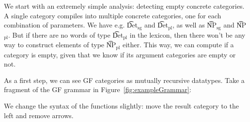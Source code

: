 We start with an extremely simple analysis: detecting empty concrete
categories. A single \gf{} category compiles into multiple concrete
categories, one for each combination of parameters. We have
e.g. \t{Det$_{\text{sg}}$} and \t{Det$_{\text{pl}}$}, as well as
\t{NP$_{\text{sg}}$} and \t{NP$_{\text{pl}}$}. But if there are no
words of type \t{Det$_{\text{pl}}$} in the lexicon, then there won't
be any way to construct elements of type \t{NP$_{\text{pl}}$}
either. This way, we can compute if a category is empty, given that we
know if its argument categories are empty or not.

As a first step, we can see GF categories as mutually recursive
datatypes. Take a fragment of the GF grammar in Figure~\ref{fig:exampleGrammar}:

\begin{EmptyItem}
\begin{Highlighting}[]
   \NormalTok{; } \NormalTok{; } \NormalTok{; } \NormalTok{; } \NormalTok{;}
   \FunctionTok{:}  \OtherTok{->}  \OtherTok{->}  \NormalTok{;}
    \FunctionTok{:}   \OtherTok{->}  \OtherTok{->}  \NormalTok{;}
    \FunctionTok{:}   \OtherTok{->}  \OtherTok{->}  \NormalTok{;}
  \FunctionTok{:}  \NormalTok{;}
  \FunctionTok{:}  \NormalTok{;}
  \FunctionTok{:} 
\end{Highlighting}
\end{EmptyItem}

\noindent We change the syntax of the functions slightly: move the result
category to the left and remove arrows.

\begin{EmptyItem}
\begin{Highlighting}[]
    \OtherTok{::=}   \NormalTok{;}
     \OtherTok{::=}   \FunctionTok{|} \FunctionTok{|} 
     \OtherTok{::=}   \NormalTok{;}
    \OtherTok{::=} \FunctionTok{|} \FunctionTok{|} 
   \OtherTok{::=} \FunctionTok{|} 
\end{Highlighting}
\end{EmptyItem}


